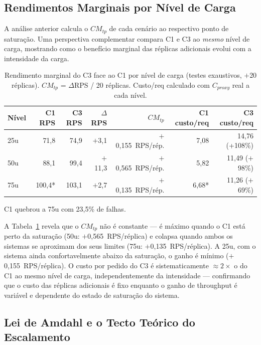 \documentclass[acmsmall,screen=true,nonacm]{acmart}
\begin{document}
\subsection{Rendimentos Marginais por Nível de Carga}
\label{subsec:rendimentos}

A análise anterior calcula o $CM_{tp}$ de cada cenário ao respectivo ponto de saturação. Uma perspectiva complementar compara C1 e C3 ao \emph{mesmo} nível de carga, mostrando como o benefício marginal das réplicas adicionais evolui com a intensidade da carga.

\begin{table}[h]
\caption{Rendimento marginal do C3 face ao C1 por nível de carga (testes exaustivos, $+$20 réplicas). $CM_{tp}$ = $\Delta$RPS / 20 réplicas. Custo/req calculado com $C_{proxy}$ real a cada nível.}
\label{tab:marginal-nivel}
\begin{tabular}{lrrrrrr}
\toprule
\textbf{Nível} & \textbf{C1 RPS} & \textbf{C3 RPS} & \textbf{$\Delta$RPS} & \textbf{$CM_{tp}$} & \textbf{C1 custo/req} & \textbf{C3 custo/req} \\
\midrule
25u & 71,8 & 74,9 & $+$3,1 & $+$0,155~RPS/rép. & 7,08 & 14,76 (+108\%) \\
50u & 88,1 & 99,4 & $+$11,3 & $+$0,565~RPS/rép. & 5,82 & 11,49 ($+$98\%) \\
75u & 100,4* & 103,1 & $+$2,7 & $+$0,135~RPS/rép. & 6,68* & 11,26 ($+$69\%) \\
\bottomrule
\end{tabular}
\end{table}
{\small *C1 quebrou a 75u com 23,5\% de falhas.}

A Tabela~\ref{tab:marginal-nivel} revela que o $CM_{tp}$ não é constante — é máximo quando o C1 está perto da saturação (50u: $+$0,565~RPS/réplica) e colapsa quando ambos os sistemas se aproximam dos seus limites (75u: $+$0,135~RPS/réplica). A 25u, com o sistema ainda confortavelmente abaixo da saturação, o ganho é mínimo ($+$0,155~RPS/réplica). O custo por pedido do C3 é sistematicamente $\approx 2\times$ o do C1 ao mesmo nível de carga, independentemente da intensidade — confirmando que o custo das réplicas adicionais é fixo enquanto o ganho de throughput é variável e dependente do estado de saturação do sistema.

\subsection{Lei de Amdahl e o Tecto Teórico do Escalamento}
\label{subsec:amdahl}
\end{document}
